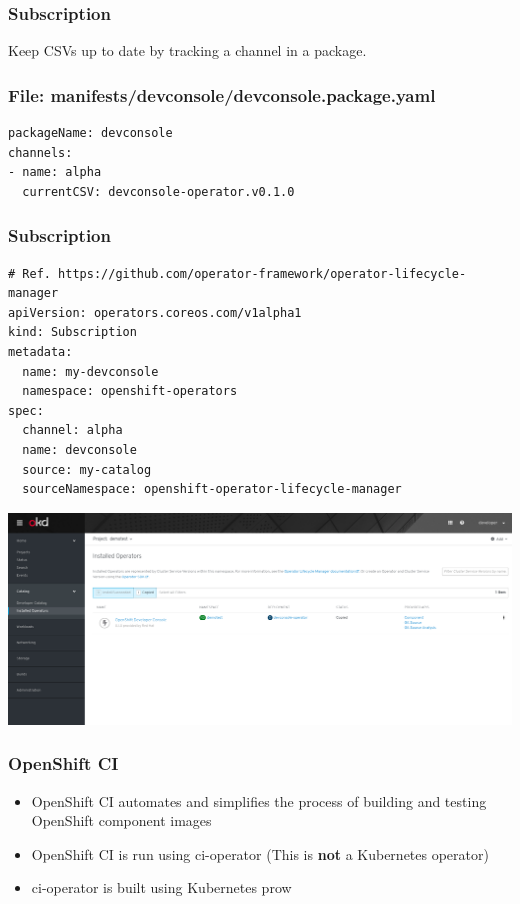 \documentclass[aspectratio=169]{beamer}
\begin{document}
\begin{frame}

  \frametitle{Subscription}

  Keep CSVs up to date by tracking a channel in a package.

\end{frame}

\begin{frame}[fragile]

  \frametitle{File: manifests/devconsole/devconsole.package.yaml}

  \begin{Verbatim}[fontsize=\small]
packageName: devconsole
channels:
- name: alpha
  currentCSV: devconsole-operator.v0.1.0
  \end{Verbatim}
\end{frame}

\begin{frame}[fragile]
  \frametitle{Subscription}

  \begin{Verbatim}[fontsize=\small]
# Ref. https://github.com/operator-framework/operator-lifecycle-manager
apiVersion: operators.coreos.com/v1alpha1
kind: Subscription
metadata:
  name: my-devconsole
  namespace: openshift-operators
spec:
  channel: alpha
  name: devconsole
  source: my-catalog
  sourceNamespace: openshift-operator-lifecycle-manager
  \end{Verbatim}
\end{frame}

\begin{frame}

  \includegraphics[scale=.20]{images/subscription.png}

\end{frame}

\begin{frame}

  \frametitle{OpenShift CI}

  \begin{itemize}
  \item OpenShift CI automates and simplifies the process of building and testing OpenShift component images
  \item OpenShift CI is run using ci-operator (This is {\bf not} a Kubernetes operator)
  \item ci-operator is built using Kubernetes prow
  \end{itemize}

\end{frame}
\end{document}
